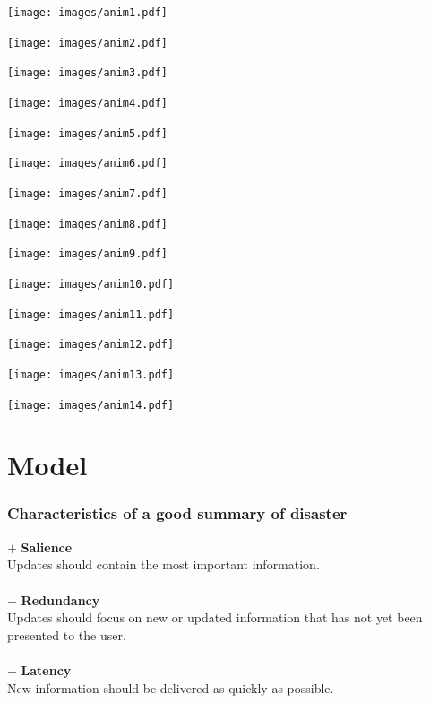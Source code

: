 \documentclass{beamer}
\begin{document}
\begin{frame}
    \texttt{[image: images/anim1.pdf]}
\end{frame}
\begin{frame}
    \texttt{[image: images/anim2.pdf]}
\end{frame}
\begin{frame}
    \texttt{[image: images/anim3.pdf]}
\end{frame}
\begin{frame}
    \texttt{[image: images/anim4.pdf]}
\end{frame}
\begin{frame}
    \texttt{[image: images/anim5.pdf]}
\end{frame}
\begin{frame}
    \texttt{[image: images/anim6.pdf]}
\end{frame}
\begin{frame}
    \texttt{[image: images/anim7.pdf]}
\end{frame}
\begin{frame}
    \texttt{[image: images/anim8.pdf]}
\end{frame}
\begin{frame}
    \texttt{[image: images/anim9.pdf]}
\end{frame}
\begin{frame}
    \texttt{[image: images/anim10.pdf]}
\end{frame}
\begin{frame}
    \texttt{[image: images/anim11.pdf]}
\end{frame}
\begin{frame}
    \texttt{[image: images/anim12.pdf]}
\end{frame}
\begin{frame}
    \texttt{[image: images/anim13.pdf]}
\end{frame}
\begin{frame}
    \texttt{[image: images/anim14.pdf]}
\end{frame}

\section{Model}

\frame{\tableofcontents[currentsection]}
\begin{frame}
\frametitle{Characteristics of a good summary of disaster}

$\pmb{+}$ \textbf{Salience} \\
Updates should contain the most important information.\\
~\\

$\pmb{-}$ \textbf{Redundancy} \\
Updates should focus on new or updated information
that has not yet been presented to the user.\\
~\\

$\pmb{-}$ \textbf{Latency} \\
New information should be delivered as quickly as possible.
~\\

\end{frame}
\end{document}
